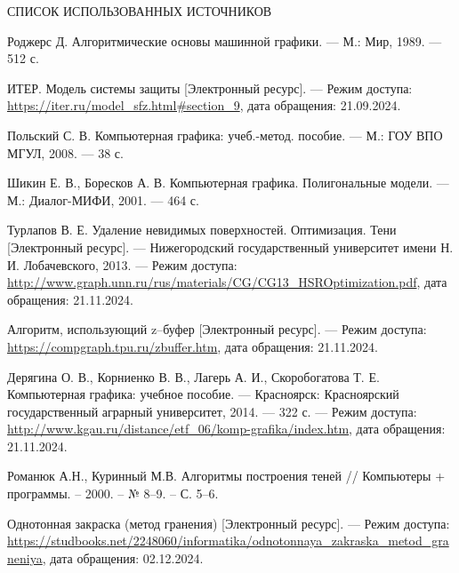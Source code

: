 \begin{center}
    \MakeUppercase{\large Список использованных источников}
\end{center}

\renewcommand{\refname}{}
\vspace{-11mm}

\makeatletter
\renewcommand\@biblabel[1]{#1.} %
\makeatother

\begin{thebibliography}{9} 
    Роджерс Д. Алгоритмические основы машинной графики. — М.: Мир, 1989. — 512 с.
    
    ИТЕР. Модель системы защиты [Электронный ресурс]. — Режим доступа: \url{https://iter.ru/model_sfz.html#section_9}, дата обращения: 21.09.2024.
    
    Польский С. В. Компьютерная графика: учеб.-метод. пособие. — М.: ГОУ ВПО МГУЛ, 2008. — 38 с.
    
    Шикин Е. В., Боресков А. В. Компьютерная графика. Полигональные модели. — М.: Диалог-МИФИ, 2001. — 464 с.
    
    Турлапов В. Е. Удаление невидимых поверхностей. Оптимизация. Тени [Электронный ресурс]. — Нижегородский государственный университет имени Н. И. Лобачевского, 2013. — Режим доступа: \url{http://www.graph.unn.ru/rus/materials/CG/CG13_HSROptimization.pdf}, дата обращения: 21.11.2024.
    
    Алгоритм, использующий z–буфер [Электронный ресурс]. — Режим доступа: \url{https://compgraph.tpu.ru/zbuffer.htm}, дата обращения: 21.11.2024.
    
    Дерягина О. В., Корниенко В. В., Лагерь А. И., Скоробогатова Т. Е. Компьютерная графика: учебное пособие. — Красноярск: Красноярский государственный аграрный университет, 2014. — 322 с. — Режим доступа: \url{http://www.kgau.ru/distance/etf_06/komp-grafika/index.htm}, дата обращения: 21.11.2024.
    
Романюк А.Н., Куринный М.В. 
Алгоритмы построения теней // Компьютеры + программы. – 2000. – № 8–9. – С. 5–6.

Однотонная закраска (метод гранения) [Электронный ресурс]. — Режим доступа: \url{https://studbooks.net/2248060/informatika/odnotonnaya_zakraska_metod_graneniya}, дата обращения: 02.12.2024.
    
\end{thebibliography}
